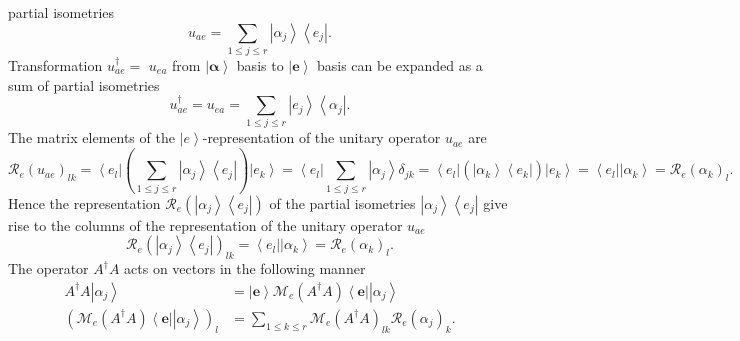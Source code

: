 \documentclass[aps,preprint]{revtex4}%
\begin{document}
partial isometries
\begin{equation}
u_{ae}=\sum_{1\leq j\leq r}\left\vert \alpha_{j}\right\rangle \left\langle
e_{j}\right\vert .
\end{equation}
Transformation $u_{ae}^{\dagger}=$ $u_{ea}$ from $\left\vert \mathbf{\alpha
}\right\rangle $ basis to $\left\vert \mathbf{e}\right\rangle $ basis can be
expanded as a sum of partial isometries
\begin{equation}
u_{ae}^{\dagger}=u_{ea}=\sum_{1\leq j\leq r}\left\vert e_{j}\right\rangle
\left\langle \alpha_{j}\right\vert .
\end{equation}
The matrix elements of the $\left\vert e\right\rangle $-representation of the
unitary operator $u_{ae}$ are
\begin{equation}
\mathcal{R}_{e}\left(  u_{ae}\right)  _{lk}=\left\langle e_{l}\right\vert
\left(  \sum_{1\leq j\leq r}\left\vert \alpha_{j}\right\rangle \left\langle
e_{j}\right\vert \right)  \left\vert e_{k}\right\rangle =\left\langle
e_{l}\right\vert \sum_{1\leq j\leq r}\left\vert \alpha_{j}\right\rangle
\delta_{jk}=\left\langle e_{l}\right\vert \left(  \overset{}{\left\vert
\alpha_{k}\right\rangle \left\langle e_{k}\right\vert }\right)  \left\vert
e_{k}\right\rangle =\left\langle e_{l}\right\vert \left\vert \alpha
_{k}\right\rangle =\mathcal{R}_{e}\left(  \alpha_{k}\right)  _{l}.
\end{equation}
Hence the representation $\mathcal{R}_{e}\left(  \left\vert \alpha
_{j}\right\rangle \left\langle e_{j}\right\vert \right)  $ of the partial
isometries $\left\vert \alpha_{j}\right\rangle \left\langle e_{j}\right\vert $
give rise to the columns of the representation of the unitary operator
$u_{ae}$
\begin{equation}
\mathcal{R}_{e}\left(  \left\vert \alpha_{j}\right\rangle \left\langle
e_{j}\right\vert \right)  _{lk}=\left\langle e_{l}\right\vert \left\vert
\alpha_{k}\right\rangle =\mathcal{R}_{e}\left(  \alpha_{k}\right)  _{l}.
\end{equation}
The operator $A^{\dagger}A$ acts on vectors in the following manner
\begin{align}
A^{\dagger}A\left\vert \alpha_{j}\right\rangle  &  =\left\vert \mathbf{e}%
\right\rangle \mathcal{M}_{e}\left(  A^{\dagger}A\right)  \left\langle
\mathbf{e}\right\vert \left\vert \alpha_{j}\right\rangle \\
\left(  \mathcal{M}_{e}\left(  A^{\dagger}A\right)  \left\langle
\mathbf{e}\right\vert \left\vert \alpha_{j}\right\rangle \right)  _{l}  &
=\sum_{1\leq k\leq r}\mathcal{M}_{e}\left(  A^{\dagger}A\right)
_{lk}\mathcal{R}_{e}\left(  \alpha_{j}\right)  _{k}.
\end{align}
\end{document}
